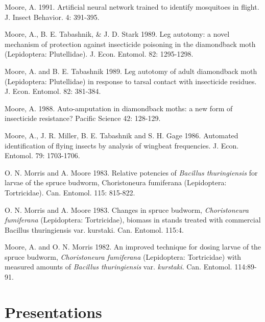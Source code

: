 \documentclass[12pt,english]{simplecv}
\begin{document}
\begin{thebibliography}{10}
Moore, A. 1991. Artificial neural network trained
to identify mosquitoes in flight. J. Insect Behavior. 4: 391-395. 

Moore, A., B. E. Tabashnik, \& J. D. Stark 1989.
Leg autotomy: a novel mechanism of protection against insecticide
poisoning in the diamondback moth (Lepidoptera: Plutellidae). J. Econ.
Entomol. 82: 1295-1298. 

Moore, A. and B. E. Tabashnik 1989. Leg autotomy
of adult diamondback moth (Lepidoptera: Plutellidae) in response to
tarsal contact with insecticide residues. J. Econ. Entomol. 82: 381-384. 

Moore, A. 1988. Auto-amputation in diamondback moths:
a new form of insecticide resistance? Pacific Science 42: 128-129. 

Moore, A., J. R. Miller, B. E. Tabashnik and S. H.
Gage 1986. Automated identification of flying insects by analysis
of wingbeat frequencies. J. Econ. Entomol. 79: 1703-1706. 

O. N. Morris and A. Moore 1983. Relative potencies
of \emph{Bacillus thuringiensis} for larvae of the spruce budworm,
Choristoneura fumiferana (Lepidoptera: Tortricidae). Can. Entomol.
115: 815-822. 

O. N. Morris and A. Moore 1983. Changes in spruce
budworm, \emph{Choristoneura fumiferana} (Lepidoptera: Tortricidae),
biomass in stands treated with commercial Bacillus thuringiensis var.
kurstaki. Can. Entomol. 115:4. 

Moore, A. and O. N. Morris 1982. An improved technique
for dosing larvae of the spruce budworm, \emph{Choristoneura fumiferana}
(Lepidoptera: Tortricidae) with measured amounts of \emph{Bacillus
thuringiensis} var. \emph{kurstaki}. Can. Entomol. 114:89-91. 

\end{thebibliography}

\section{Presentations}
\end{document}
